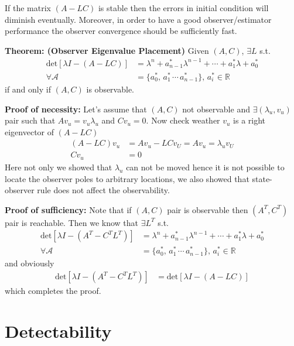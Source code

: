 \documentclass[twoside]{article}
\begin{document}
If the matrix $\left( A - L C \right)$ is stable then the errors in
initial condition will diminish eventually. Moreover, in order
to have a good observer/estimator performance the observer
convergence should be sufficiently fast. 

\textbf{Theorem: (Observer Eigenvalue Placement)} Given $(A,C)$, $\exists L$ s.t. 
%
\begin{align*}
	\mathrm{det}\left[ \lambda I - (A - L C ) \right] &= \lambda^n + a_{n-1}^*  \lambda^{n-1}
	+ \cdots + a_{1}^* \lambda + a_0^*
	\\
	\forall \mathcal{A} &= \lbrace a_0^* , \, a_1^* \, \cdots \, a_{n-1}^* \rbrace , \, a_i^* \in \mathbb{R}
\end{align*} 
%
if and only if $(A,C)$ is observable. 

\textbf{Proof of necessity: } Let's assume that $(A,C)$ not observable and $\exists (\lambda_u , v_u)$ pair such that
$A v_u = v_u \lambda_u $ and $C v_u = 0$. Now check weather $v_u$ is a right eigenvector of $(A - L C)$
%
\begin{align*}
	 (A - L C ) v_u &= A v_u - L C v_U = A v_u = \lambda_u v_U
	\\
        C v_u  &= 0
\end{align*} 
%
Here not only we showed that $\lambda_u$ can not be moved hence it is not possible to locate the observer poles to
arbitrary locations, we also showed that state-observer rule does not affect the observability.

\textbf{Proof of sufficiency:} Note that if $(A,C)$ pair is observable then $(A^T,C^T)$ pair is reachable. Then we know that 
$\exists L^T$ s.t. 
%
\begin{align*}
	\mathrm{det}\left[ \lambda I - (A^T - C^T L^T ) \right] &= \lambda^n + a_{n-1}^*  \lambda^{n-1}
	+ \cdots + a_{1}^* \lambda + a_0^* 
	\\
	\forall \mathcal{A} &= \lbrace a_0^* , \, a_1^* \, \cdots \, a_{n-1}^* \rbrace , \, a_i^* \in \mathbb{R}
\end{align*} 
%
and obviously 
%
\begin{align*}
	\mathrm{det}\left[ \lambda I - (A^T - C^T L^T ) \right] &= \mathrm{det}\left[ \lambda I - (A - L C ) \right] 
\end{align*} 
%
which completes the proof.

\section{Detectability}
\end{document}
